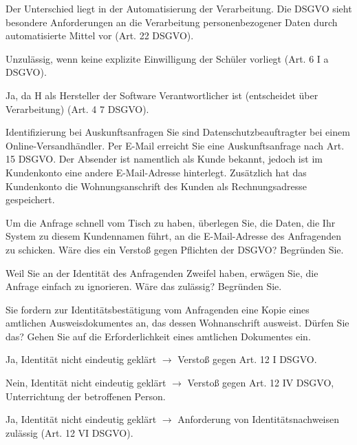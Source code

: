 \documentclass{article}
\begin{document}
\begin{solutions}
  \item Der Unterschied liegt in der Automatisierung der Verarbeitung. Die DSGVO sieht besondere Anforderungen an die Verarbeitung personenbezogener Daten durch automatisierte Mittel vor (Art. 22 DSGVO).
  \item Unzulässig, wenn keine explizite Einwilligung der Schüler vorliegt (Art. 6 I a DSGVO).
  \item Ja, da H als Hersteller der Software Verantwortlicher ist (entscheidet über Verarbeitung) (Art. 4 7 DSGVO).
\end{solutions}

\begin{eexercises}{Identifizierung bei Auskunftsanfragen}{
    Sie sind Datenschutzbeauftragter bei einem Online-Versandhändler. Per E-Mail erreicht Sie eine Auskunftsanfrage nach Art. 15 DSGVO. Der Absender ist namentlich als Kunde bekannt, jedoch ist im Kundenkonto eine andere E-Mail-Adresse hinterlegt. Zusätzlich hat das Kundenkonto die Wohnungsanschrift des Kunden als Rechnungsadresse gespeichert.
  }
  \item Um die Anfrage schnell vom Tisch zu haben, überlegen Sie, die Daten, die Ihr System zu diesem Kundennamen führt, an die E-Mail-Adresse des Anfragenden zu schicken. Wäre dies ein Verstoß gegen Pflichten der DSGVO? Begründen Sie.
  \item Weil Sie an der Identität des Anfragenden Zweifel haben, erwägen Sie, die Anfrage einfach zu ignorieren. Wäre das zulässig? Begründen Sie.
  \item Sie fordern zur Identitätsbestätigung vom Anfragenden eine Kopie eines amtlichen Ausweisdokumentes an, das dessen Wohnanschrift ausweist. Dürfen Sie das? Gehen Sie auf die Erforderlichkeit eines amtlichen Dokumentes ein.
\end{eexercises}

\begin{solutions}
  \item Ja, Identität nicht eindeutig geklärt $\to$ Verstoß gegen Art. 12 I DSGVO.
  \item Nein, Identität nicht eindeutig geklärt $\to$ Verstoß gegen Art. 12 IV DSGVO, Unterrichtung der betroffenen Person.
  \item Ja, Identität nicht eindeutig geklärt $\to$ Anforderung von Identitätsnachweisen zulässig (Art. 12 VI DSGVO).
\end{solutions}
\end{document}
